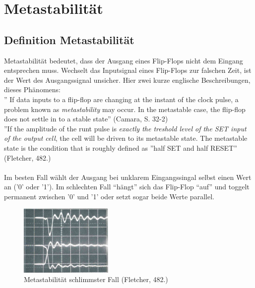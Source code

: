 
\chapter{Metastabilität}\label{chap.metastabilitat}

\section{Definition Metastabilität}\label{sect.meatastabil_def}
Metastabilität bedeutet, dass der Ausgang eines Flip-Flops nicht dem Eingang entsprechen muss. Wechselt das Inputsignal eines Flip-Flops zur falschen Zeit, ist der Wert des Ausgangssignal unsicher. Hier zwei kurze englische Beschreibungen, dieses Phänomens:\\
\newline
'' If data inputs to a flip-flop are changing at the instant of the clock pulse, a problem known as \textit{metastability} may occur. In the metastable case, the flip-flop does not settle in to a stable state'' (Camara, S. 32-2)  \\
\newline
''If the amplitude of the runt pulse is \textit{exactly the treshold level of the SET input of the output cell}, the cell will be driven to its metastable state. The metastable state is the condition that is roughly defined as ''half SET and half RESET'' (Fletcher, 482.)\\
\newline
\\
Im besten Fall wählt der Ausgang bei unklarem Eingangssingal selbst einen Wert an ('0' oder '1'). Im schlechten Fall “hängt” sich das Flip-Flop “auf” und toggelt permanent zwischen '0' und '1' oder setzt sogar beide Werte parallel.

\begin{figure}[H]
	\centering
	\includegraphics[width=0.4\textwidth]{images/metastability/metastability_2_IO.png}
	\caption{Metastabilität schlimmster Fall (Fletcher, 482.)}
	\label{fig.metastabil.schlimmster_Fall}
\end{figure}


